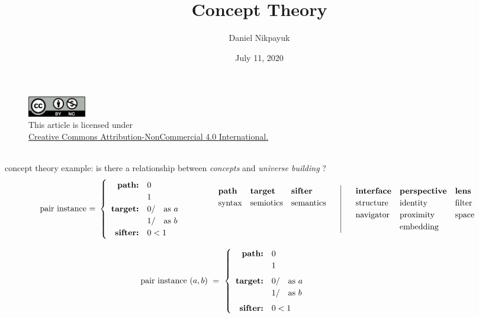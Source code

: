 \documentclass[twoside]{article}
\title{Concept Theory}
\author{Daniel Nikpayuk}
\date{July 11, 2020}
\newcommand{\bfmbox}[1]{\mbox{\bfseries #1}}
\newcommand{\tab}[1][1.125cm]{\hspace{#1}}
\newcommand{\col}[1][0ex]{& \hspace{#1}}
\begin{document}
\maketitle
\thispagestyle{empty}

\begin{figure}[h]
\centering
\includegraphics[width=1in]{../cc-by-nc.png}\\[0.1in]
\tiny This article is licensed under \\
\href{http://creativecommons.org/licenses/by-nc/4.0/}
{Creative Commons Attribution-NonCommercial 4.0 International.}\\[0.3in]
\end{figure}

\ \\
\indent concept theory example: \tab[3.5cm] is there a relationship between \emph{concepts} and \emph{universe building} ?\\[-3ex]

$$ \def\arraystretch{1.2}
\tab[-0cm] \mbox{pair instance = }\left\{\begin{array}{rl}
\bfmbox{path:}		& 0							\\
			& 1							\\
\bfmbox{target:}	& 0/ \quad \mbox{as } a					\\
			& 1/ \quad \mbox{as } b					\\
\bfmbox{sifter:}	& 0 < 1							\\
\end{array}\right. \tab[1.25cm] \begin{array}{lll|lll}
\bfmbox{path}		& \bfmbox{target}	& \bfmbox{sifter}		\tab[3ex]\col[3ex]
\bfmbox{interface}	& \bfmbox{perspective}	& \bfmbox{lens}			\\

\mbox{syntax}		& \mbox{semiotics}	& \mbox{semantics}		\tab[3ex]\col[3ex]
\mbox{structure}	& \mbox{identity}	& \mbox{filter}			\\&&\col[3ex]
\mbox{navigator}	& \mbox{proximity}	& \mbox{space}			\\&&\col[3ex]
			& \mbox{embedding}
\end{array} $$

$$ \def\arraystretch{1.2}
\tab[-3cm] \mbox{pair instance } (a,b)\ =\ \left\{\begin{array}{rl}
\bfmbox{path:}		& 0							\\
			& 1							\\[1ex]
\bfmbox{target:}	& 0/ \quad \mbox{as } a					\\
			& 1/ \quad \mbox{as } b					\\[1ex]
\bfmbox{sifter:}	& 0 < 1							\\
\end{array}\right. $$
\ \\[-6ex]
\end{document}
